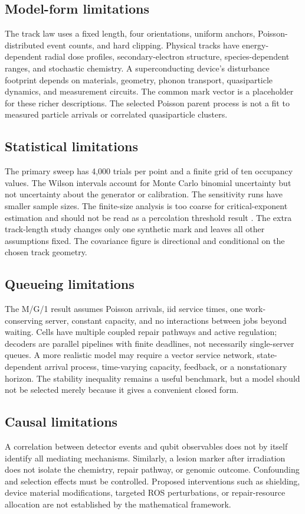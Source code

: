 \documentclass[11pt,a4paper,oneside]{article}
\begin{document}
\subsection{Model-form limitations}
The track law uses a fixed length, four orientations, uniform anchors, Poisson-distributed event counts, and hard clipping. Physical tracks have energy-dependent radial dose profiles, secondary-electron structure, species-dependent ranges, and stochastic chemistry. A superconducting device's disturbance footprint depends on materials, geometry, phonon transport, quasiparticle dynamics, and measurement circuits. The common mark vector is a placeholder for these richer descriptions. The selected Poisson parent process is not a fit to measured particle arrivals or correlated quasiparticle clusters.

\subsection{Statistical limitations}
The primary sweep has 4,000 trials per point and a finite grid of ten occupancy values. The Wilson intervals account for Monte Carlo binomial uncertainty but not uncertainty about the generator or calibration. The sensitivity runs have smaller sample sizes. The finite-size analysis is too coarse for critical-exponent estimation and should not be read as a percolation threshold result \citep{Grimmett1999}. The extra track-length study changes only one synthetic mark and leaves all other assumptions fixed. The covariance figure is directional and conditional on the chosen track geometry.

\subsection{Queueing limitations}
The M/G/1 result assumes Poisson arrivals, iid service times, one work-conserving server, constant capacity, and no interactions between jobs beyond waiting. Cells have multiple coupled repair pathways and active regulation; decoders are parallel pipelines with finite deadlines, not necessarily single-server queues. A more realistic model may require a vector service network, state-dependent arrival process, time-varying capacity, feedback, or a nonstationary horizon. The stability inequality remains a useful benchmark, but a model should not be selected merely because it gives a convenient closed form.

\subsection{Causal limitations}
A correlation between detector events and qubit observables does not by itself identify all mediating mechanisms. Similarly, a lesion marker after irradiation does not isolate the chemistry, repair pathway, or genomic outcome. Confounding and selection effects must be controlled. Proposed interventions such as shielding, device material modifications, targeted ROS perturbations, or repair-resource allocation are not established by the mathematical framework.
\end{document}
